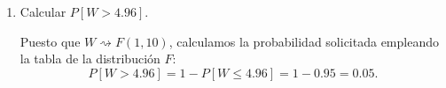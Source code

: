 \begin{ejercicio}
\begin{enumerate}
    Del primer apartado, sabemos que:
    \begin{align*}
        Z &= \frac{\sqrt{8}(\ol{X}_1 - \ol{X}_2)}{\sigma\sqrt{3}} \rightsquigarrow \mathcal{N}(0, 1) \implies Z^2 \rightsquigarrow \chi^2(1),\\
        V &= \frac{3S_1^2 + 7S_2^2}{\sigma^2} \rightsquigarrow \chi^2(10),
    \end{align*}
    y $Z$ y $V$ son independientes, luego $Z^2$ y $V$ también lo son. Por tanto, podemos aplicar la construcción de la distribución $F$ de Snedecor:
    \begin{align*}
        \left.\begin{array}{l}
            Z^2 \rightsquigarrow \chi^2(1) \\
            V \rightsquigarrow \chi^2(10) \\
            Z^2 \text{ y } V \text{ independientes}
        \end{array}\right\} \Longrightarrow \frac{\nicefrac{Z^2}{1}}{\nicefrac{V}{10}} \rightsquigarrow F(1, 10)
    \end{align*}

    Calculamos el cociente de las variables aleatorias:
    \begin{align*}
        \dfrac{\nicefrac{Z^2}{1}}{\nicefrac{V}{10}} &= \frac{\dfrac{\dfrac{8}{3}(\ol{X}_1 - \ol{X}_2)^2}{\cancel{\sigma^2}}}{\dfrac{\dfrac{3S_1^2 + 7S_2^2}{\cancel{\sigma^2}}}{10}} = \frac{\dfrac{8}{3}(\ol{X}_1 - \ol{X}_2)^2}{\dfrac{3S_1^2 + 7S_2^2}{10}} = W \rightsquigarrow F(1, 10).
    \end{align*}

    \item Calcular $P[W > 4.96]$.
    
    Puesto que $W \rightsquigarrow F(1, 10)$, calculamos la probabilidad solicitada empleando la tabla de la distribución $F$:
    \[
    P[W > 4.96] = 1 - P[W \le 4.96] = 1 - 0.95 = 0.05.
    \]
\end{enumerate}

\end{ejercicio}


